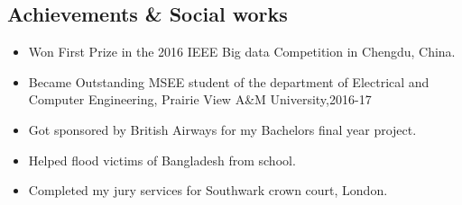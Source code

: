 \begin{singlespace}
\section*{\large \bf Achievements \& Social works}


\begin{itemize}
\item Won First Prize in the 2016 IEEE Big data Competition in Chengdu, China.
\item Became Outstanding MSEE student of the department of Electrical and Computer Engineering, Prairie View A\&M University,2016-17
\item Got sponsored by British Airways for my Bachelors final year project.
\item Helped flood victims of Bangladesh from school.
\item Completed my jury services for Southwark crown court, London.

\end{itemize}

\end{singlespace}




